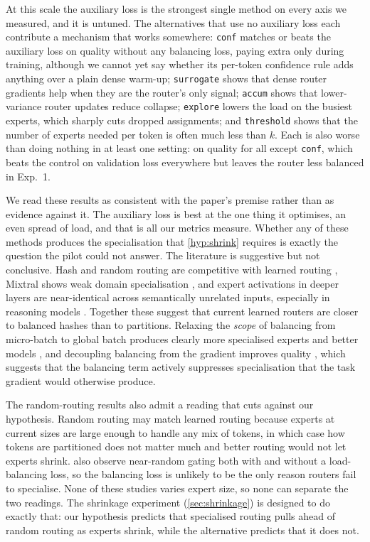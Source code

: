 \documentclass[10pt]{article}
\theoremstyle{definition}
\theoremstyle{remark}
\newcommand{\code}[1]{\texttt{#1}}
\begin{document}
At this scale the auxiliary loss is the strongest single method on every axis we measured, and it is untuned. The alternatives that use no auxiliary loss each contribute a mechanism that works somewhere: \code{conf} matches or beats the auxiliary loss on quality without any balancing loss, paying extra only during training, although we cannot yet say whether its per-token confidence rule adds anything over a plain dense warm-up; \code{surrogate} shows that dense router gradients help when they are the router's only signal; \code{accum} shows that lower-variance router updates reduce collapse; \code{explore} lowers the load on the busiest experts, which sharply cuts dropped assignments; and \code{threshold} shows that the number of experts needed per token is often much less than $k$. Each is also worse than doing nothing in at least one setting: on quality for all except \code{conf}, which beats the control on validation loss everywhere but leaves the router less balanced in Exp.~1.

We read these results as consistent with the paper's premise rather than as evidence against it. The auxiliary loss is best at the one thing it optimises, an even spread of load, and that is all our metrics measure. Whether any of these methods produces the specialisation that \cref{hyp:shrink} requires is exactly the question the pilot could not answer. The literature is suggestive but not conclusive. Hash and random routing are competitive with learned routing \citep{roller2021hash,zuo2022thor,fan2024empirical}, Mixtral shows weak domain specialisation \citep{jiang2024mixtral}, and expert activations in deeper layers are near-identical across semantically unrelated inputs, especially in reasoning models \citep{wang2026myth}. Together these suggest that current learned routers are closer to balanced hashes than to partitions. Relaxing the \emph{scope} of balancing from micro-batch to global batch produces clearly more specialised experts and better models \citep{qiu2025demons}, and decoupling balancing from the gradient improves quality \citep{wang2024auxfree}, which suggests that the balancing term actively suppresses specialisation that the task gradient would otherwise produce.

The random-routing results also admit a reading that cuts against our hypothesis. Random routing may match learned routing because experts at current sizes are large enough to handle any mix of tokens, in which case how tokens are partitioned does not matter much and better routing would not let experts shrink. \citet{zuo2022thor} also observe near-random gating both with and without a load-balancing loss, so the balancing loss is unlikely to be the only reason routers fail to specialise. None of these studies varies expert size, so none can separate the two readings. The shrinkage experiment (\cref{sec:shrinkage}) is designed to do exactly that: our hypothesis predicts that specialised routing pulls ahead of random routing as experts shrink, while the alternative predicts that it does not.
\end{document}
